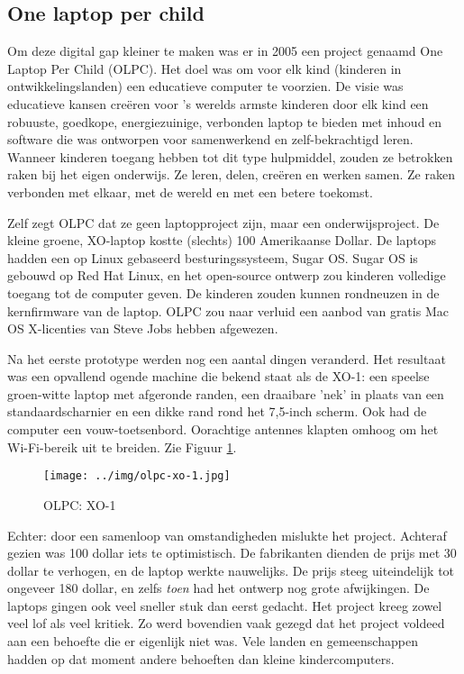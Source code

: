 \subsection{One laptop per child}
Om deze digital gap kleiner te maken was er in 2005 een project genaamd One Laptop Per Child (OLPC). Het doel was om voor elk kind (kinderen in ontwikkelingslanden) een educatieve computer te voorzien. De visie was educatieve kansen creëren voor 's werelds armste kinderen door elk kind een robuuste, goedkope, energiezuinige, verbonden laptop te bieden met inhoud en software die was ontworpen voor samenwerkend en zelf-bekrachtigd leren. Wanneer kinderen toegang hebben tot dit type hulpmiddel, zouden ze betrokken raken bij het eigen onderwijs. Ze leren, delen, creëren en werken samen. Ze raken verbonden met elkaar, met de wereld en met een betere toekomst. \autocite{OneLaptopPerChild2005}

Zelf zegt OLPC dat ze geen laptopproject zijn, maar een onderwijsproject. De kleine groene, XO-laptop kostte (slechts) 100 Amerikaanse Dollar. De laptops hadden een op Linux gebaseerd besturingssysteem, Sugar OS. Sugar OS is gebouwd op Red Hat Linux, en het open-source ontwerp zou kinderen volledige toegang tot de computer geven. De kinderen zouden kunnen rondneuzen in de kernfirmware van de laptop. OLPC zou naar verluid een aanbod van gratis Mac OS X-licenties van Steve Jobs hebben afgewezen. \autocite{Robertson2018}

Na het eerste prototype werden nog een aantal dingen veranderd. Het resultaat was een opvallend ogende machine die bekend staat als de XO-1: een speelse groen-witte laptop met afgeronde randen, een draaibare 'nek' in plaats van een standaardscharnier en een dikke rand rond het 7,5-inch scherm. Ook had de computer een vouw-toetsenbord. Oorachtige antennes klapten omhoog om het Wi-Fi-bereik uit te breiden. Zie Figuur \ref{xo-1}. \autocite{Robertson2018}

 \begin{figure}[h!]
	\texttt{[image: ../img/olpc-xo-1.jpg]}
	\caption{OLPC: XO-1}
	\label{xo-1}
\end{figure}

Echter: door een samenloop van omstandigheden mislukte het project. Achteraf gezien was 100 dollar iets te optimistisch. De fabrikanten dienden de prijs met 30 dollar te verhogen, en de laptop werkte nauwelijks. De prijs steeg uiteindelijk tot ongeveer 180 dollar, en zelfs \textit{toen} had het ontwerp nog grote afwijkingen. De laptops gingen ook veel sneller stuk dan eerst gedacht. Het project kreeg zowel veel lof als veel kritiek. Zo werd bovendien vaak gezegd dat het project voldeed aan een behoefte die er eigenlijk niet was. Vele landen en gemeenschappen hadden op dat moment andere behoeften dan kleine kindercomputers. \autocite{Robertson2018}

